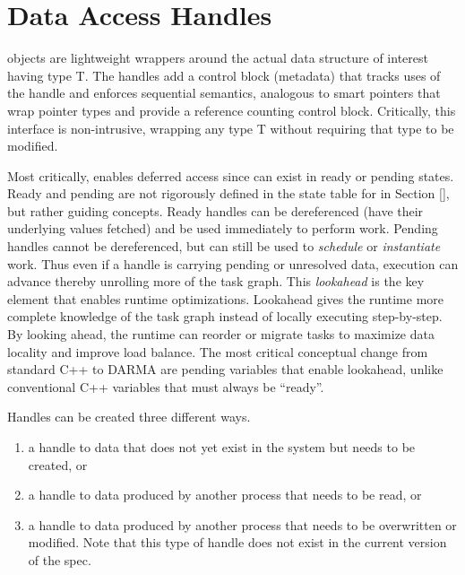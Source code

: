 

\section{Data Access Handles}
\label{sec:handles}
\ahandleT objects are lightweight wrappers around the actual data structure of interest having type T. 
The handles add a control block (metadata) that tracks uses of the handle and enforces
\gls{sequential semantics}, analogous to smart pointers that wrap pointer types and provide a reference counting control block.
Critically, this interface is non-intrusive, wrapping any type T without requiring that type to be modified.

Most critically, \ahandle enables deferred access since \ahandle can exist in ready or pending states. 
Ready and pending are not rigorously defined in the state table for \ahandle in Section \ref{},
but rather guiding concepts.
Ready handles can be dereferenced (have their underlying values fetched) and be used immediately to perform work.
Pending handles cannot be dereferenced, but can still be used to \emph{schedule} or \emph{instantiate} work.
Thus even if a handle is carrying pending or unresolved data, execution can advance thereby unrolling more of the task graph.
This \emph{lookahead} is the key element that enables runtime optimizations.
Lookahead gives the runtime more complete knowledge of the task graph instead of locally executing step-by-step.
By looking ahead, the runtime can reorder or migrate tasks to maximize data locality and improve load balance.
The most critical conceptual change from standard C++ to DARMA are pending variables that enable lookahead, unlike conventional C++ variables that must always be ``ready''.

Handles can be created three different ways.
\begin{enumerate}
\item a handle to data that does not yet exist in the system
but needs to be created, or
\item a handle to data produced by another process that needs to
be read, or 
\item a handle to data produced by another process that needs to be overwritten or modified. 
Note that this type of handle does not exist in the current version of the spec.
\end{enumerate}

